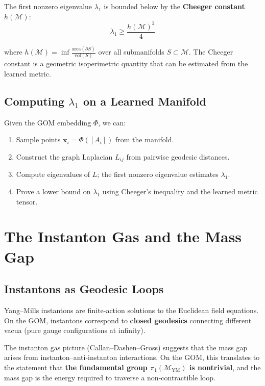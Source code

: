\documentclass{article}
\begin{document}
The first nonzero eigenvalue $\lambda_1$ is bounded below by the
\textbf{Cheeger constant} $h(\mathcal{M})$:
\begin{equation}
\lambda_1 \geq \frac{h(\mathcal{M})^2}{4}
\end{equation}

where $h(\mathcal{M}) = \inf \frac{\mathrm{area}(\partial S)}{\mathrm{vol}(S)}$
over all submanifolds $S \subset \mathcal{M}$.  The Cheeger constant is a
geometric isoperimetric quantity that can be estimated from the learned metric.

\subsection{Computing $\lambda_1$ on a Learned Manifold}

Given the GOM embedding $\Phi$, we can:
\begin{enumerate}
  \item Sample points $\mathbf{x}_i = \Phi([A_i])$ from the manifold.
  \item Construct the graph Laplacian $L_{ij}$ from pairwise geodesic distances.
  \item Compute eigenvalues of $L$; the first nonzero eigenvalue estimates
    $\lambda_1$.
  \item Prove a lower bound on $\lambda_1$ using Cheeger's inequality and
    the learned metric tensor.
\end{enumerate}

\section{The Instanton Gas and the Mass Gap}
\label{sec:instantons}

\subsection{Instantons as Geodesic Loops}

Yang--Mills instantons are finite-action solutions to the Euclidean field
equations.  On the GOM, instantons correspond to \textbf{closed geodesics}
connecting different vacua (pure gauge configurations at infinity).

The instanton gas picture (Callan--Dashen--Gross) suggests that the mass gap
arises from instanton--anti-instanton interactions.  On the GOM, this
translates to the statement that \textbf{the fundamental group
$\pi_1(\mathcal{M}_{\mathrm{YM}})$ is nontrivial}, and the mass gap is the
energy required to traverse a non-contractible loop.
\end{document}

